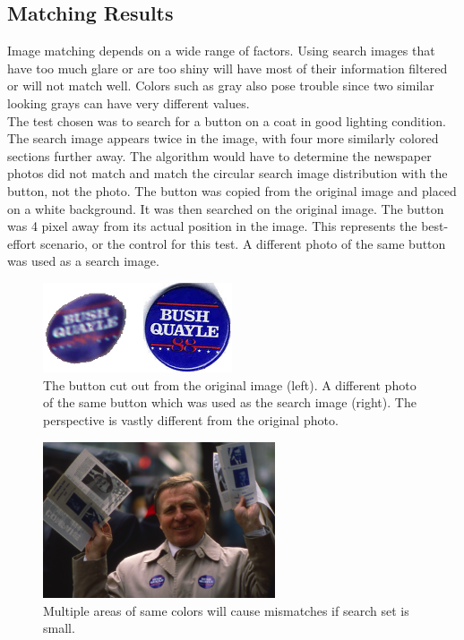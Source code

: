 \documentclass[10pt, journal]{vgtc}                %
\newcommand\tab[1][1cm]{\hspace*{#1}}
\begin{document}
\subsection{Matching Results}
\begin{flushleft}
	\tab Image matching depends on a wide range of factors. Using search images that have too much glare or are too shiny will have most of their information filtered or will not match well. Colors such as gray also pose trouble since two similar looking grays can have very different values. \\\smallskip
	\tab The test chosen was to search for a button on a coat in good lighting condition. The search image appears twice in the image, with four more similarly colored sections further away. The algorithm would have to determine the newspaper photos did not match and match the circular search image distribution with the button, not the photo. The button was copied from the original image and placed on a white background. It was then searched on the original image. The button was 4 pixel away from its actual position in the image. This represents the best-effort scenario, or the control for this test. A different photo of the same button was used as a search image.\\
	\begin{figure}[h!]
		\centering
		\includegraphics[width=2.2in]{button.png}
		\caption{The button cut out from the original image (left). A different photo of the same button which was used as the search image (right). The perspective is vastly different from the original photo.}
	\end{figure}
	\begin{figure}[h!]
		\centering
		\includegraphics[width=2.7in]{eight.png}
		\caption{Multiple areas of same colors will cause mismatches if search set is small.}

\end{figure}
\end{flushleft}
\end{document}

